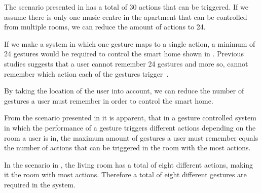 The scenario presented in  has a total of 30 actions that can be triggered. If we assume there is only one music centre in the apartment that can be controlled from multiple rooms, we can reduce the amount of actions to 24.

If we make a system in which one gesture maps to a single action, a minimum of 24 gestures would be required to control the smart home shown in . Previous studies suggests that a user cannot remember 24 gestures and more so, cannot remember which action each of the gestures trigger~\cite{Kela2006,miller1956magical}.

By taking the location of the user into account, we can reduce the number of gestures a user must remember in order to control the smart home.

From the scenario presented in  it is apparent, that in a gesture controlled system in which the performance of a gesture triggers different actions depending on the room a user is in, the maximum amount of gestures a user must remember equals the number of actions that can be triggered in the room with the most actions.

In the scenario in , the living room has a total of eight different actions, making it the room with most actions. Therefore a total of eight different gestures are required in the system.

